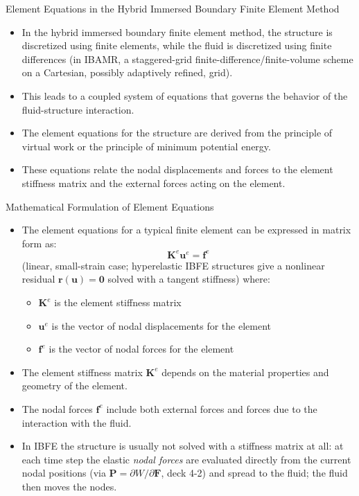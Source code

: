 \documentclass[aspectratio=169,11pt]{beamer}
\begin{document}
\begin{frame}{Element Equations in the Hybrid Immersed Boundary Finite Element Method}
    \begin{itemize}
        \item In the hybrid immersed boundary finite element method, the structure is discretized using finite elements, while the fluid is discretized using finite differences (in IBAMR, a staggered-grid finite-difference/finite-volume scheme on a Cartesian, possibly adaptively refined, grid).
        \item This leads to a coupled system of equations that governs the behavior of the fluid-structure interaction.
        \item The element equations for the structure are derived from the principle of virtual work or the principle of minimum potential energy.
        \item These equations relate the nodal displacements and forces to the element stiffness matrix and the external forces acting on the element.
    \end{itemize}
\end{frame}

\begin{frame}{Mathematical Formulation of Element Equations}
    \begin{itemize}
        \item The element equations for a typical finite element can be expressed in matrix form as:
        \begin{equation*}
        \mathbf{K}^e \mathbf{u}^e = \mathbf{f}^e
        \end{equation*}
        (linear, small-strain case; hyperelastic IBFE structures give a nonlinear residual $\mathbf{r}(\mathbf{u}) = \mathbf{0}$ solved with a tangent stiffness)
        where:
        \begin{itemize}
            \item $\mathbf{K}^e$ is the element stiffness matrix
            \item $\mathbf{u}^e$ is the vector of nodal displacements for the element
            \item $\mathbf{f}^e$ is the vector of nodal forces for the element
        \end{itemize}
        \item The element stiffness matrix $\mathbf{K}^e$ depends on the material properties and geometry of the element.
        \item The nodal forces $\mathbf{f}^e$ include both external forces and forces due to the interaction with the fluid.
        \item In IBFE the structure is usually not solved with a stiffness matrix at all: at each time step the elastic \emph{nodal forces} are evaluated directly from the current nodal positions (via $\mathbf{P}=\partial W/\partial\mathbf{F}$, deck 4-2) and spread to the fluid; the fluid then moves the nodes.
    \end{itemize}
\end{frame}
\end{document}
